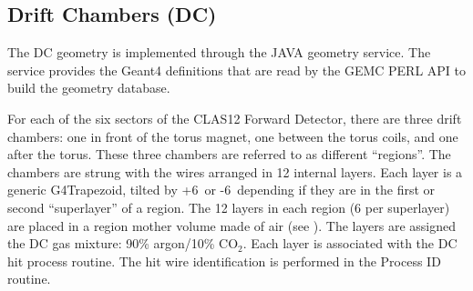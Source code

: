 \subsection{Drift Chambers (DC)}

The DC geometry is implemented through the JAVA geometry service. The service provides the Geant4 definitions that
are read by the GEMC PERL API to build the geometry database.

For each of the six sectors of the CLAS12 Forward Detector, there are three drift chambers: one in front of the torus
magnet, one between the torus coils, and one after the torus.  These three chambers are referred to as different
``regions''. The chambers are strung with the wires arranged in 12 internal layers. Each layer is a generic G4Trapezoid,
tilted by +6\mdeg \ or -6\mdeg \ depending if they are in the first or second ``superlayer'' of a region. The 12 layers
in each region (6 per superlayer) are placed in a region mother volume made of air (see ). The layers are
assigned the DC gas mixture: 90\% argon/10\% CO$_2$. Each layer is associated with the DC hit process routine.
The hit wire identification is performed in the Process ID routine.

